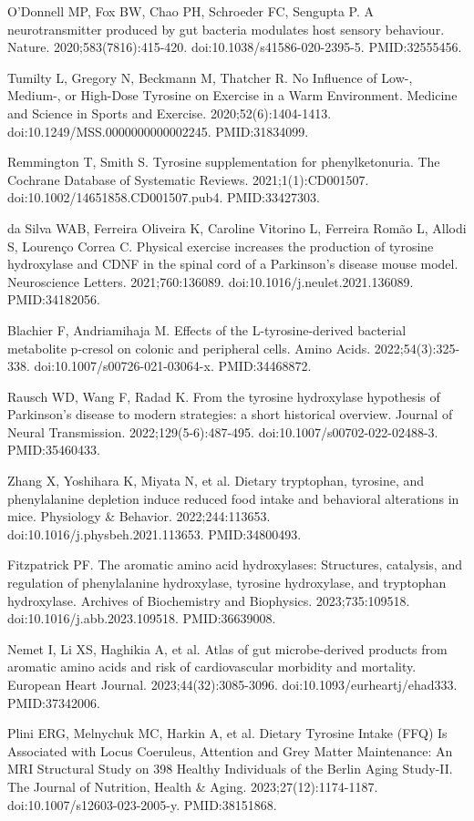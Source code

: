 \documentclass[11pt,oneside]{book}
\newcommand{\reff}[2]{\par\hangindent=7mm\hangafter=1\noindent[#1]\hspace{2mm}#2\par}
\begin{document}
\reff{11}{O'Donnell MP, Fox BW, Chao PH, Schroeder FC, Sengupta P. A neurotransmitter produced by gut bacteria modulates host sensory behaviour. Nature. 2020;583(7816):415-420. doi:10.1038/s41586-020-2395-5. PMID:32555456.}
\reff{12}{Tumilty L, Gregory N, Beckmann M, Thatcher R. No Influence of Low-, Medium-, or High-Dose Tyrosine on Exercise in a Warm Environment. Medicine and Science in Sports and Exercise. 2020;52(6):1404-1413. doi:10.1249/MSS.0000000000002245. PMID:31834099.}
\reff{13}{Remmington T, Smith S. Tyrosine supplementation for phenylketonuria. The Cochrane Database of Systematic Reviews. 2021;1(1):CD001507. doi:10.1002/14651858.CD001507.pub4. PMID:33427303.}
\reff{14}{da Silva WAB, Ferreira Oliveira K, Caroline Vitorino L, Ferreira Romão L, Allodi S, Lourenço Correa C. Physical exercise increases the production of tyrosine hydroxylase and CDNF in the spinal cord of a Parkinson's disease mouse model. Neuroscience Letters. 2021;760:136089. doi:10.1016/j.neulet.2021.136089. PMID:34182056.}
\reff{15}{Blachier F, Andriamihaja M. Effects of the L-tyrosine-derived bacterial metabolite p-cresol on colonic and peripheral cells. Amino Acids. 2022;54(3):325-338. doi:10.1007/s00726-021-03064-x. PMID:34468872.}
\reff{16}{Rausch WD, Wang F, Radad K. From the tyrosine hydroxylase hypothesis of Parkinson's disease to modern strategies: a short historical overview. Journal of Neural Transmission. 2022;129(5-6):487-495. doi:10.1007/s00702-022-02488-3. PMID:35460433.}
\reff{17}{Zhang X, Yoshihara K, Miyata N, et al. Dietary tryptophan, tyrosine, and phenylalanine depletion induce reduced food intake and behavioral alterations in mice. Physiology \& Behavior. 2022;244:113653. doi:10.1016/j.physbeh.2021.113653. PMID:34800493.}
\reff{18}{Fitzpatrick PF. The aromatic amino acid hydroxylases: Structures, catalysis, and regulation of phenylalanine hydroxylase, tyrosine hydroxylase, and tryptophan hydroxylase. Archives of Biochemistry and Biophysics. 2023;735:109518. doi:10.1016/j.abb.2023.109518. PMID:36639008.}
\reff{19}{Nemet I, Li XS, Haghikia A, et al. Atlas of gut microbe-derived products from aromatic amino acids and risk of cardiovascular morbidity and mortality. European Heart Journal. 2023;44(32):3085-3096. doi:10.1093/eurheartj/ehad333. PMID:37342006.}
\reff{20}{Plini ERG, Melnychuk MC, Harkin A, et al. Dietary Tyrosine Intake (FFQ) Is Associated with Locus Coeruleus, Attention and Grey Matter Maintenance: An MRI Structural Study on 398 Healthy Individuals of the Berlin Aging Study-II. The Journal of Nutrition, Health \& Aging. 2023;27(12):1174-1187. doi:10.1007/s12603-023-2005-y. PMID:38151868.}
\end{document}
